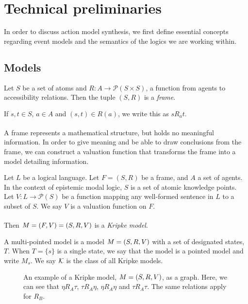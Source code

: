 \chapter{Technical preliminaries} \label{chapter:prelim}
In order to discuss action model synthesis, we first define essential concepts regarding event
models and the semantics of the logics we are working within.

\section{Models} \label{subsec:prelim:models}

\begin{defn} \label{frame}
	Let $S$ be a set of atoms and $R: A \to \mathcal{P}(S \times S)$, a function from agents to
	accessibility relations.
	Then the tuple $(S, R)$ is a {\em frame}.
\end{defn}

If $s, t \in S$, $a \in A$ and $(s,t) \in R(a)$, we write this as $s R_a t$.\\
\\
A frame represents a mathematical structure, but holds no meaningful information.
In order to give meaning and be able to draw conclusions from the frame, we can
construct a valuation function that transforms the frame into a model detailing
information.

\begin{defn} \label{model}
	Let $L$ be a logical language.
	Let $F = (S, R)$ be a frame, and $A$ a set of agents.
	In the context of epistemic modal logic, $S$ is a set of atomic knowledge points.
	Let $V: L \to \mathcal{P}(S)$ be a function mapping any
	well-formed	sentence in $L$ to a subset of $S$.
	We say $V$ is a valuation function on $F$.\\
	\\
	Then $M = (F, V) = (S, R, V)$ is a {\em Kripke model}.
\end{defn}

A multi-pointed model is a model $M = (S, R, V)$ with a set of designated states, $T$.
When $T = \{s\}$ is a single state, we say that the model is a pointed model and write $M_s$.
We say $\mathcal{K}$ is the class of all Kripke models.

\begin{figure}
\centering
{}
\caption[Kripke model example of coin-game]{An example of a Kripke model, $M = (S,R,V)$, as a graph. Here, we can see that
$\eta R_A \tau$, $\tau R_A \eta$, $\eta R_A \eta$ and $\tau R_A \tau$. The same relations apply for
$R_B$.}
\label{figure:exampleModel}
\end{figure}

